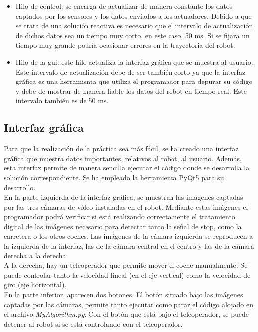 \begin{itemize}
\item	Hilo de control: se encarga de actualizar de manera constante los datos captados por los sensores y los datos enviados a los actuadores. Debido a que se trata de una solución reactiva es necesario que el intervalo de actualización de dichos datos sea un tiempo muy corto, en este caso, 50 ms. Si se fijara un tiempo muy grande podría ocasionar errores en la trayectoria del robot.
\item	Hilo de la \acrshort{gui}: este hilo actualiza la interfaz gráfica que se muestra al usuario. Este intervalo de actualización debe de ser también corto ya que la interfaz gráfica es una herramienta que utiliza el programador para depurar su código y debe de mostrar de manera fiable los datos del robot en tiempo real. Este intervalo también es de 50 ms.
\end{itemize}


\subsection{Interfaz gráfica}
Para que la realización de la práctica sea más fácil, se ha creado una interfaz gráfica que muestra datos importantes, relativos al robot, al usuario. Además, esta interfaz permite de manera sencilla ejecutar el código donde se desarrolla la solución correspondiente. Se ha empleado la herramienta PyQt5 para su desarrollo.\\

En la parte izquierda de la interfaz gráfica, se muestran las imágenes captadas por las tres cámaras de vídeo instaladas en el robot. Mediante estas imágenes el programador podrá verificar si está realizando correctamente el tratamiento digital de las imágenes necesario para detectar tanto la señal de stop, como la carretera o los otros coches. Las imágenes de la cámara izquierda se reproducen a la izquierda de la interfaz, las de la cámara central en el centro y las de la cámara derecha a la derecha.\\

A la derecha, hay un teleoperador que permite mover el coche manualmente. Se puede controlar tanto la velocidad lineal (en el eje vertical) como la velocidad de giro (eje horizontal). \\

En la parte inferior, aparecen dos botones. El botón situado bajo las imágenes captadas por las cámaras, permite tanto ejecutar como parar el código alojado en el archivo \textit{MyAlgorithm.py}. Con el botón que está bajo el teleoperador, se puede detener al robot si se está controlando con el teleoperador. \\

